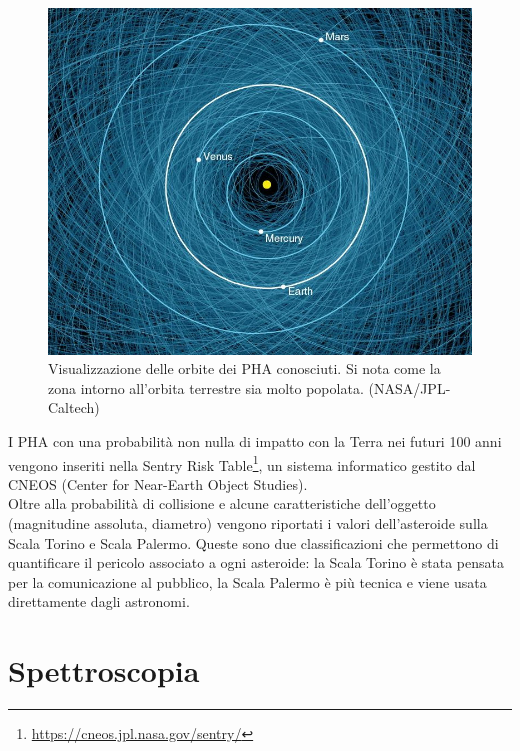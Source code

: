 \documentclass[a4paper,11pt,openright]{book}
\begin{document}
\begin{figure}
    \centering
    \includegraphics[scale=0.35]{figure/pha_map.jpg}
    \caption[Visualizzazione delle orbite dei PHA conosciuti.]{Visualizzazione delle orbite dei PHA conosciuti. Si nota come la zona intorno all'orbita terrestre sia molto popolata. (NASA/JPL-Caltech)}
    \label{fig:pha_map}
\end{figure}

I PHA con una probabilità non nulla di impatto con la Terra nei futuri 100 anni vengono inseriti nella Sentry Risk Table\footnote{\href {https://cneos.jpl.nasa.gov/sentry/}{https://cneos.jpl.nasa.gov/sentry/} }, un sistema informatico gestito dal CNEOS (Center for Near-Earth Object Studies).\\
Oltre alla probabilità di collisione e alcune caratteristiche dell’oggetto (magnitudine assoluta, diametro) vengono riportati i valori dell’asteroide sulla Scala Torino e Scala Palermo. Queste sono due classificazioni che permettono di quantificare il pericolo associato a ogni asteroide: la Scala Torino è stata pensata per la comunicazione al pubblico, la Scala Palermo è più tecnica e viene usata direttamente dagli astronomi.


\chapter{Spettroscopia}\label{ch:ch_2}
\end{document}
